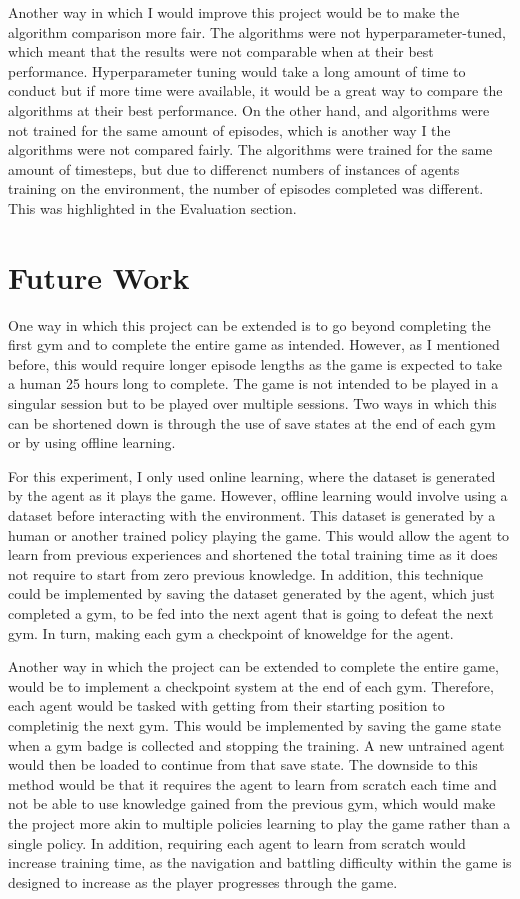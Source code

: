 Another way in which I would improve this project would be to make the algorithm comparison more fair. The algorithms were not hyperparameter-tuned, which meant that the results were not comparable when at their best performance. Hyperparameter tuning would take a long amount of time to conduct but if more time were available, it would be a great way to compare the algorithms at their best performance. On the other hand, and algorithms were not trained for the same amount of episodes, which is another way I the algorithms were not compared fairly. The algorithms were trained for the same amount of timesteps, but due to differenct numbers of instances of agents training on the environment, the number of episodes completed was different. This was highlighted in the Evaluation section.

\newpage

\section{Future Work}

One way in which this project can be extended is to go beyond completing the first gym and to complete the entire game as intended. However, as I mentioned before, this would require longer episode lengths as the game is expected to take a human 25 hours long to complete. The game is not intended to be played in a singular session but to be played over multiple sessions. Two ways in which this can be shortened down is through the use of save states at the end of each gym or by using offline learning. 

For this experiment, I only used online learning, where the dataset is generated by the agent as it plays the game. However, offline learning would involve using a dataset before interacting with the environment. This dataset is generated by a human or another trained policy playing the game. This would allow the agent to learn from previous experiences and shortened the total training time as it does not require to start from zero previous knowledge. In addition, this technique could be implemented by saving the dataset generated by the agent, which just completed a gym, to be fed into the next agent that is going to defeat the next gym. In turn, making each gym a checkpoint of knoweldge for the agent. 

Another way in which the project can be extended to complete the entire game, would be to implement a checkpoint system at the end of each gym. Therefore, each agent would be tasked with getting from their starting position to completinig the next gym. This would be implemented by saving the game state when a gym badge is collected and stopping the training. A new untrained agent would then be loaded to continue from that save state. The downside to this method would be that it requires the agent to learn from scratch each time and not be able to use knowledge gained from the previous gym, which would make the project more akin to multiple policies learning to play the game rather than a single policy. In addition, requiring each agent to learn from scratch would increase training time, as the navigation and battling difficulty within the game is designed to increase as the player progresses through the game.

